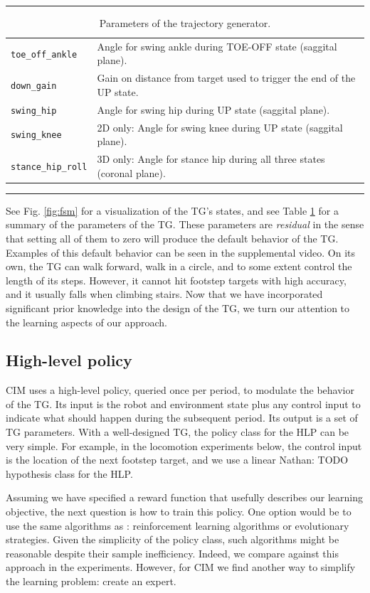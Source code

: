 \documentclass[conference]{IEEEtran}
\newcommand{\nhatch}[1]{{\leavevmode\color{magenta} Nathan: #1}}
\begin{document}
\begin{table}
  \normalsize
  \caption{Parameters of the trajectory generator.}
  \label{table:params}
  \hrule
  \begin{tabular}{ll}
    \texttt{toe\_off\_ankle} & Angle for swing ankle during TOE-OFF state (saggital plane). \\
    \texttt{down\_gain} & Gain on distance from target used to trigger the end of the UP state. \\
    \texttt{swing\_hip} & Angle for swing hip during UP state (saggital plane). \\
    \texttt{swing\_knee} & 2D only: Angle for swing knee during UP state (saggital plane). \\
    \texttt{stance\_hip\_roll} & 3D only: Angle for stance hip during all three states (coronal plane). \\
  \end{tabular}
  \hrule
\end{table}

See Fig. \ref{fig:fsm} for a visualization of the TG's states, and
see Table \ref{table:params} for a summary of the parameters of the TG.
These parameters are \emph{residual} in the sense that setting all of them to zero will produce the default behavior of the TG.
Examples of this default behavior can be seen in the supplemental video.
On its own, the TG can walk forward, walk in a circle, and to some extent control the length of its steps.
However, it cannot hit footstep targets with high accuracy, and it usually falls when climbing stairs.
Now that we have incorporated significant prior knowledge into the design of the TG, we turn our attention to the learning aspects of our approach.

\subsection{High-level policy}

CIM uses a high-level policy, queried once per period, to modulate the behavior of the TG.
Its input is the robot and environment state plus any control input to indicate what should happen during the subsequent period.
Its output is a set of TG parameters.
With a well-designed TG, the policy class for the HLP can be very simple.
For example, in the locomotion experiments below, the control input is the location of the next footstep target,
and we use a linear \nhatch{TODO} hypothesis class for the HLP.

Assuming we have specified a reward function that usefully describes our learning objective, the next question is how to train this policy.
One option would be to use the same algorithms as \citet{iscen2018pmtg}: reinforcement learning algorithms or evolutionary strategies.
Given the simplicity of the policy class, such algorithms might be reasonable despite their sample inefficiency.
Indeed, we compare against this approach in the experiments.
However, for CIM we find another way to simplify the learning problem: create an expert.
\end{document}
